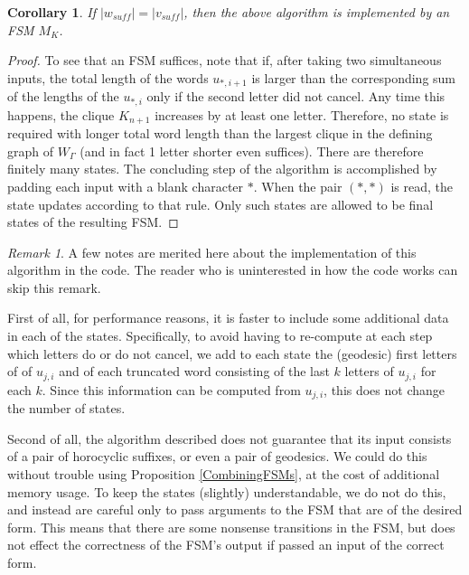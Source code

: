 \documentclass[10pt,a4paper]{amsart}
\newtheorem{corollary}[theorem]{Corollary}
\theoremstyle{definition}
\theoremstyle{remark}
\newtheorem{remark}[theorem]{Remark}
\begin{document}
	
	\begin{corollary} \label{DivergenceGraphEqualLengthEdgeFSM}
		If $|w_{suff}|=|v_{suff}|$, then the above algorithm is implemented by an FSM $M_{K}$.
	\end{corollary}
	
	\begin{proof}
		To see that an FSM suffices, note that if, after taking two simultaneous inputs, the total length of the words $u_{*, i+1}$ is larger than the corresponding sum of the lengths of the $u_{*, i}$ only if the second letter did not cancel. Any time this happens, the clique $K_{n+1}$ increases by at least one letter. Therefore, no state is required with longer total word length than the largest clique in the defining graph of $W_\Gamma$ (and in fact 1 letter shorter even suffices). There are therefore finitely many states. The concluding step of the algorithm is accomplished by padding each input with a blank character $*$. When the pair $(*, *)$ is read, the state updates according to that rule. Only such states are allowed to be final states of the resulting FSM.
	\end{proof}
	
	\begin{remark}
		
		A few notes are merited here about the implementation of this algorithm in the code. The reader who is uninterested in how the code works can skip this remark.
		
		First of all, for performance reasons, it is faster to include some additional data in each of the states. Specifically, to avoid having to re-compute at each step which letters do or do not cancel, we add to each state the (geodesic) first letters of of $u_{j,i}$ and of each truncated word consisting of the last $k$ letters of $u_{j,i}$ for each $k$. Since this information can be computed from $u_{j,i}$, this does not change the number of states.
		
		Second of all, the algorithm described does not guarantee that its input consists of a pair of horocyclic suffixes, or even a pair of geodesics. We could do this without trouble using Proposition \ref{CombiningFSMs}, at the cost of additional memory usage. To keep the states (slightly) understandable, we do not do this, and instead are careful only to pass arguments to the FSM that are of the desired form. This means that there are some nonsense transitions in the FSM, but does not effect the correctness of the FSM's output if passed an input of the correct form.
		
	\end{remark}
	
\end{document}
